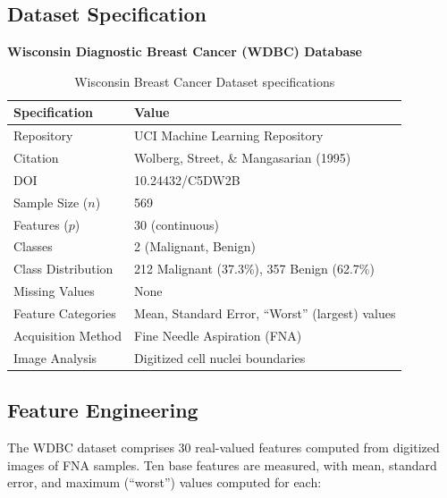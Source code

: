 \documentclass[11pt,a4paper]{article}
\begin{document}
\subsection{Dataset Specification}

\textbf{Wisconsin Diagnostic Breast Cancer (WDBC) Database}

\begin{table}[H]
\centering
\caption{Wisconsin Breast Cancer Dataset specifications}
\begin{tabular}{ll}
\toprule
\textbf{Specification} & \textbf{Value} \\
\midrule
Repository & UCI Machine Learning Repository \\
Citation & Wolberg, Street, \& Mangasarian (1995) \\
DOI & 10.24432/C5DW2B \\
Sample Size ($n$) & 569 \\
Features ($p$) & 30 (continuous) \\
Classes & 2 (Malignant, Benign) \\
Class Distribution & 212 Malignant (37.3\%), 357 Benign (62.7\%) \\
Missing Values & None \\
Feature Categories & Mean, Standard Error, ``Worst'' (largest) values \\
Acquisition Method & Fine Needle Aspiration (FNA) \\
Image Analysis & Digitized cell nuclei boundaries \\
\bottomrule
\end{tabular}
\label{tab:dataset}
\end{table}

\subsection{Feature Engineering}

The WDBC dataset comprises 30 real-valued features computed from digitized images of FNA samples. Ten base features are measured, with mean, standard error, and maximum (``worst'') values computed for each:
\end{document}
